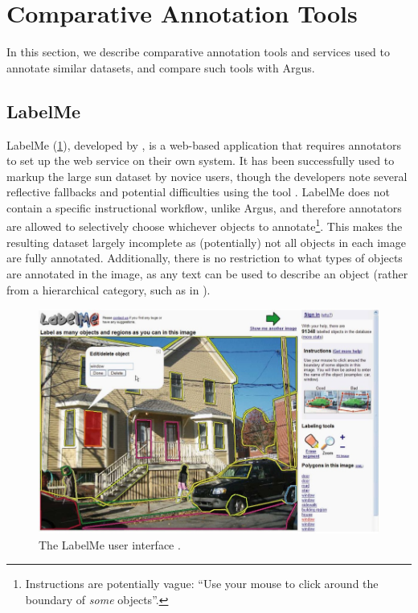 \section{Comparative Annotation Tools}
\label{sec:dataset:architecture_evaluation:tools}

In this section, we describe comparative annotation tools and services used to annotate similar datasets, and compare such tools with Argus.

\subsection{LabelMe} 

LabelMe (\cref{fig:dataset:architecture_evaluation:tools:label_me}), developed by \citet{Russell:2008wm}, is a web-based application that requires annotators to set up the web service on their own system. It has been successfully used to markup the large \gls{sun} dataset by novice users, though the developers note several reflective fallbacks and potential difficulties using the tool \citep{DBLP:journals/corr/abs-1210-3448}. LabelMe does not contain a specific instructional workflow, unlike Argus, and therefore annotators are allowed to selectively choose whichever objects to annotate\footnote{Instructions are potentially vague: ``Use your mouse to click around the boundary of \textit{some} objects''.}. This makes the resulting dataset largely incomplete as (potentially) not all objects in each image are fully annotated. Additionally, there is no restriction to what types of objects are annotated in the image, as any text can be used to describe an object (rather from a hierarchical category, such as in \citep{Lin:2014vma}).

\begin{figure}[h]
  \includegraphics[width=\textwidth]{images/dataset/tools/label_me}
  \caption[The LabelMe user interface]{The LabelMe user interface \citep{Russell:2008wm}.}
  \label{fig:dataset:architecture_evaluation:tools:label_me}
\end{figure}

